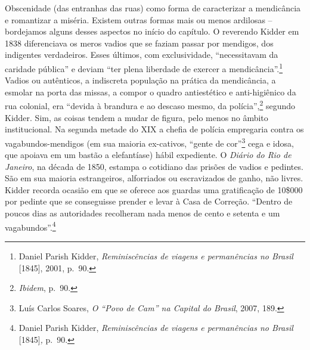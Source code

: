 Obscenidade (das entranhas das ruas) como forma de caracterizar a
mendicância e romantizar a miséria. Existem outras formas mais ou menos
ardilosas -- bordejamos alguns desses aspectos no início do capítulo. O
reverendo Kidder em 1838 diferenciava os meros vadios que se faziam
passar por mendigos, dos indigentes verdadeiros. Esses últimos, com
exclusividade, ``necessitavam da caridade pública'' e deviam ``ter plena
liberdade de exercer a mendicância''.\footnote{Daniel Parish Kidder,
  \emph{Reminiscências de viagens e permanências no Brasil} {[}1845{]},
  2001, p.~90.} Vadios ou autênticos, a indiscreta população na prática
da mendicância, a esmolar na porta das missas, a compor o quadro
antiestético e anti-higiênico da rua colonial, era ``devida à brandura e
ao descaso mesmo, da polícia'',\footnote{\emph{Ibidem}, p.~90.} segundo
Kidder. Sim, as coisas tendem a mudar de figura, pelo menos no âmbito
institucional. Na segunda metade do XIX a chefia de polícia empregaria
contra os vagabundos-mendigos (em sua maioria ex-cativos, ``gente de
cor''\footnote{Luís Carlos Soares, \emph{O ``Povo de Cam'' na Capital do
  Brasil}, 2007, 189.} cega e idosa, que apoiava em um bastão a
elefantíase) hábil expediente. O \emph{Diário do Rio de Janeiro}, na
década de 1850, estampa o cotidiano das prisões de vadios e pedintes.
São em sua maioria estrangeiros, alforriados ou escravizados de ganho,
não livres. Kidder recorda ocasião em que se oferece aos guardas uma
gratificação de 10\$000 por pedinte que se conseguisse prender e levar à
Casa de Correção. ``Dentro de poucos dias as autoridades recolheram nada
menos de cento e setenta e um vagabundos''.\footnote{Daniel Parish
  Kidder, \emph{Reminiscências de viagens e permanências no Brasil}
  {[}1845{]}\emph{,} p.~90.}

